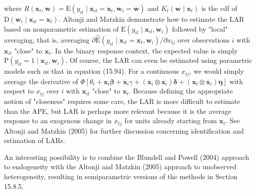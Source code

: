 \documentclass[10pt]{article}
\begin{document}
where $R\left(\mathbf{x}_{t}, \mathbf{w}\right)=\mathrm{E}\left(y_{i t} \mid \mathbf{x}_{i t}=\mathbf{x}_{t}, \mathbf{w}_{i}=\mathbf{w}\right)$ and $K_{t}\left(\mathbf{w} \mid \mathbf{x}_{t}\right)$ is the cdf of $\mathrm{D}\left(\mathbf{w}_{i} \mid \mathbf{x}_{i t}=\mathbf{x}_{t}\right)$. Altonji and Matzkin demonstrate how to estimate the LAR based on nonparametric estimation of $\mathrm{E}\left(y_{i t} \mid \mathbf{x}_{i t}, \mathbf{w}_{i}\right)$ followed by "local" averaging, that is, averaging $\partial \hat{\mathrm{E}}\left(y_{i t} \mid \mathbf{x}_{i t}=\mathbf{x}_{t}, \mathbf{w}_{i}\right) / \partial x_{t j}$ over observations $i$ with $\mathbf{x}_{i t}$ "close" to $\mathbf{x}_{t}$. In the binary response context, the expected value is simply $\mathrm{P}\left(y_{i t}=1 \mid \mathbf{x}_{i t}, \mathbf{w}_{i}\right)$. Of course, the LAR can even be estimated using parametric models such as that in equation (15.94). For a continuous $x_{t j}$, we would simply average the derivative of $\Phi\left[\theta_{t}+\mathbf{x}_{t} \boldsymbol{\beta}+\overline{\mathbf{x}}_{i} \gamma+\right. \left.\left(\overline{\mathbf{x}}_{i} \otimes \overline{\mathbf{x}}_{i}\right) \boldsymbol{\delta}+\left(\mathbf{x}_{t} \otimes \overline{\mathbf{x}}_{i}\right) \boldsymbol{\eta}\right]$ with respect to $x_{t j}$ over $i$ with $\mathbf{x}_{i t}$ "close" to $\mathbf{x}_{t}$. Because defining the appropriate notion of "closeness" requires some care, the LAR is more difficult to estimate than the APE, but LAR is perhaps more relevant because it is the average response to an exogenous change in $x_{t j}$ for units already starting from $\mathbf{x}_{t}$. See Altonji and Matzkin (2005) for further discussion concerning identification and estimation of LARs.

An interesting possibility is to combine the Blundell and Powell (2004) approach to endogeneity with the Altonji and Matzkin (2005) approach to unobserved heterogeneity, resulting in semiparametric versions of the methods in Section 15.8.5.
\end{document}
